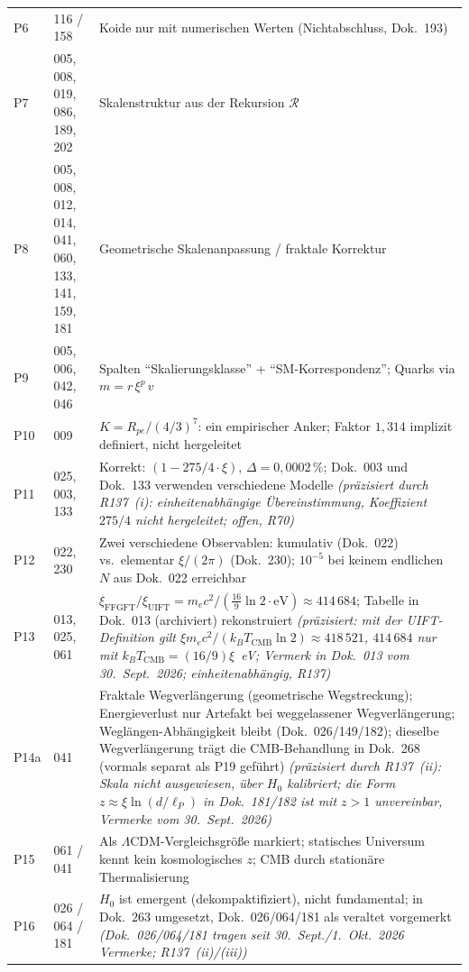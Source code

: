 \begin{longtable}{@{}p{0.9cm}p{3.1cm}p{10.2cm}@{}}
P6 & 116 / 158 & Koide nur mit numerischen Werten (Nichtabschluss, Dok.~193) \\
P7 & 005, 008, 019, 086, 189, 202 & Skalenstruktur aus der Rekursion $\mathcal{R}$ \\
P8 & 005, 008, 012, 014, 041, 060, 133, 141, 159, 181 & Geometrische Skalen\-anpassung / fraktale Korrektur \\
P9 & 005, 006, 042, 046 & Spalten \enquote{Skalierungs\-klasse} + \enquote{SM-Korrespondenz}; \newline Quarks via $m = r\,\xi^p\,v$ \\
P10 & 009 & $K = R_{pe}/(4/3)^7$: ein empirischer Anker; \newline Faktor $1{,}314$ implizit definiert, nicht hergeleitet \\
P11 & 025, 003, 133 & Korrekt: $(1-275/4\cdot\xi)$, $\Delta=0{,}0002\,\%$; \newline Dok.~003 und Dok.~133 verwenden verschiedene Modelle \emph{(präzisiert durch R137~(i): einheitenabhängige Übereinstimmung, Koeffizient $275/4$ nicht hergeleitet; offen, R70)} \\
P12 & 022, 230 & Zwei verschiedene Observablen: kumulativ (Dok.~022) vs.\ elementar $\xi/(2\pi)$ (Dok.~230); $10^{-5}$ bei keinem endlichen $N$ aus Dok.~022 erreichbar \\
P13 & 013, 025, 061 & $\xi_\text{FFGFT}/\xi_\text{UIFT} = m_ec^2/(\frac{16}{9}\ln 2\cdot\text{eV}) \approx 414\,684$; \newline Tabelle in Dok.~013 (archiviert) rekonstruiert \emph{(präzisiert: mit der UIFT-Definition gilt $\xi m_ec^2/(k_BT_{\mathrm{CMB}}\ln 2)\approx418\,521$, $414\,684$ nur mit $k_BT_{\mathrm{CMB}}=(16/9)\xi$~eV; Vermerk in Dok.~013 vom 30.~Sept.~2026; einheitenabhängig, R137)} \\
P14a & 041 & Fraktale Wegverlängerung (geometrische Wegstreckung); Energieverlust nur Artefakt bei weggelassener Wegverlängerung; Weglängen-Abhängigkeit bleibt (Dok.~026/149/182); dieselbe Wegverlängerung trägt die CMB-Behandlung in Dok.~268 (vormals separat als P19 geführt) \emph{(präzisiert durch R137~(ii): Skala nicht ausgewiesen, über $H_0$ kalibriert; die Form $z\approx\xi\ln(d/\ell_P)$ in Dok.~181/182 ist mit $z>1$ unvereinbar, Vermerke vom 30.~Sept.~2026)} \\
P15 & 061 / 041 & Als $\Lambda$CDM-Vergleichsgröße markiert; statisches Universum kennt kein kosmologisches $z$; CMB durch stationäre Thermalisierung \\
P16 & 026 / 064 / 181 & $H_0$ ist emergent (dekompaktifiziert), nicht fundamental; in Dok.~263 umgesetzt, Dok.~026/064/181 als veraltet vorgemerkt \emph{(Dok.~026/064/181 tragen seit 30.~Sept./1.~Okt.~2026 Vermerke; R137~(ii)/(iii))} \\

\end{longtable}
